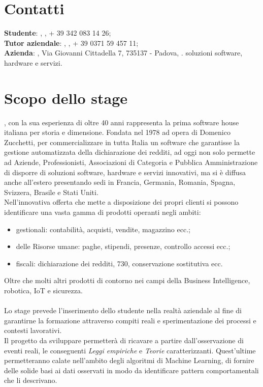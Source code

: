 \section{Contatti}
\textbf{Studente}: \myName, , + 39 342 083 14 26;\\
\textbf{Tutor aziendale}: \Greg, , + 39 0371 59 457 11;\\
\textbf{Azienda}: \myCompany, Via Giovanni Cittadella 7, 735137 - Padova, \sitoCompany.
soluzioni software, hardware e servizi. 

\section{Scopo dello stage}
\textit{\myCompany}, con la sua esperienza di oltre 40 anni rappresenta la prima software house italiana per storia e dimensione. Fondata nel 1978 ad opera di Domenico Zucchetti, per commercializzare in tutta Italia un software che garantisse la gestione automatizzata della dichiarazione dei redditi, ad oggi non solo permette ad Aziende, Professionisti, Associazioni di Categoria e Pubblica Amministrazione di disporre di  soluzioni software, hardware e servizi innovativi, ma si è diffusa anche all'estero presentando sedi in Francia, Germania, Romania, Spagna, Svizzera, Brasile e Stati Uniti.\\ Nell'innovativa offerta che \textit{\myCompany{}} mette a disposizione dei propri clienti si possono identificare una vasta gamma di prodotti operanti negli ambiti:
\begin{itemize}
\item gestionali: contabilità, acquisti, vendite, magazzino ecc.;
\item delle Risorse umane: paghe, stipendi, presenze, controllo accessi ecc.;
\item fiscali: dichiarazione dei redditi, 730, conservazione sostitutiva ecc.
\end{itemize}
Oltre che molti altri prodotti di contorno nei campi della Business Intelligence, robotica, IoT e  sicurezza.
\\\\
Lo stage prevede l'inserimento dello studente nella realtà aziendale al fine di garantirne la formazione attraverso compiti reali e sperimentazione dei processi e contesti lavorativi. \\
Il progetto da sviluppare permetterà di ricavare a partire dall'osservazione di eventi reali, le conseguenti \textit{Leggi empiriche} e \textit{Teorie} caratterizzanti. Quest'ultime permetteranno calate nell'ambito degli algoritmi di Machine Learning, di fornire delle solide basi ai dati osservati in modo da identificare pattern comportamentali che li descrivano.
